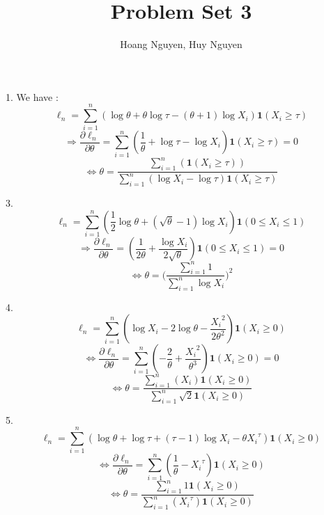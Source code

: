 \documentclass[10pt]{article}
\newenvironment{problem}[2][Problem]{\begin{trivlist}
\item[\hskip \labelsep {\bfseries #1}\hskip \labelsep {\bfseries #2.}]}{\end{trivlist}}
\begin{document}
\title{Problem Set 3}
\author{Hoang Nguyen, Huy Nguyen}
\maketitle


\begin{problem}{1}

\item 1.
We have :
\[\ell_n=\sum_{i=1}^{n}(\log \theta + \theta\log\tau - (\theta+1)\log X_i) \mathbf{1}(X_i \geqslant \tau)\]
\[\Rightarrow \frac{\partial \ell_n}{\partial \theta}=\sum_{i=1}^{n}(\frac{1}{\theta}+ \log \tau-\log X_i) \mathbf{1}(X_i \geqslant \tau)=0\]
\[\Leftrightarrow \theta= \frac{\sum_{i=1}^{n}(\mathbf{1}(X_i \geqslant \tau))}{\sum_{i=1}^{n}(\log X_i-\log \tau)\mathbf{1}(X_i \geqslant \tau)}\]
\item 3.
\[\ell_n=\sum_{i=1}^{n}(\frac{1}{2}\log \theta+(\sqrt{\theta}-1)\log X_i)\mathbf{1}(0 \leqslant X_i \leqslant1)\]
\[\Rightarrow \frac{\partial \ell_n}{\partial \theta}=(\frac{1}{2\theta}+\frac{\log X_i}{2\sqrt{\theta}})\mathbf{1}(0 \leqslant X_i \leqslant1)=0\]
\[\Leftrightarrow \theta=\Big(\frac{\sum_{i=1}^{n}1}{\sum_{i=1}^{n}\log X_i}\Big)^2\]
\item 4.
\[\ell_n=\sum_{i=1}^{n}(\log X_i-2\log \theta-\frac{{X_i}^2}{2\theta^2})\mathbf{1}(X_i \geqslant 0)\]
\[\Leftrightarrow \frac{\partial \ell_n}{\partial \theta}=\sum_{i=1}^{n}(-\frac{2}{\theta}+\frac{{X_i}^2}{\theta^3})\mathbf{1}(X_i \geqslant 0)=0\]
\[\Leftrightarrow \theta=\frac{\sum_{i=1}^{n}(X_i)\mathbf{1}(X_i \geqslant 0)}{\sum_{i=1}^{n}\sqrt{2}\mathbf{1}(X_i \geqslant 0)}\]
\item 5.
\[\ell_n=\sum_{i=1}^{n}(\log \theta+ \log \tau+(\tau-1)\log X_i-\theta{X_i}^{\tau})\mathbf{1}(X_i \geqslant 0)\]
\[\Leftrightarrow \frac{\partial \ell_n}{\partial \theta}=\sum_{i=1}^{n}(\frac{1}{\theta}-{X_i}^{\tau})\mathbf{1}(X_i \geqslant 0)\]
\[\Leftrightarrow \theta=\frac{\sum_{i=1}^{n} 1\mathbf{1}(X_i \geqslant 0) }{\sum_{i=1}^{n} ({X_i}^{\tau})\mathbf{1}(X_i \geqslant 0)}\]



\end{problem}
\end{document}
